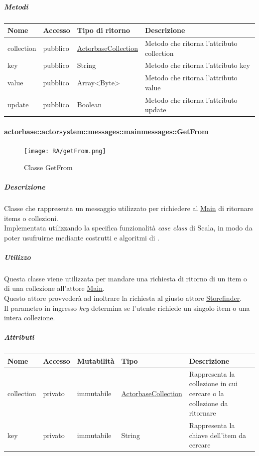 \documentclass{scalatekids-article}
\begin{document}
\subparagraph{Metodi}
\begin{tabular}{| p{3cm} | p{1.5cm} | p{3.5cm} | p{9cm} |}
  \hline
  Nome & Accesso & Tipo di ritorno & Descrizione\\
  \hline
  collection & pubblico & \hyperref[sec:actorbase::actorsystem::utils::ActorbaseCollection]{ActorbaseCollection} & Metodo che ritorna l'attributo collection\\
  \hline
  key & pubblico & String & Metodo che ritorna l'attributo key\\
  \hline
  value & pubblico & Array<Byte> & Metodo che ritorna l'attributo value\\
  \hline
  update & pubblico & Boolean & Metodo che ritorna l'attributo update\\
  \hline
\end{tabular}

\paragraph{actorbase::actorsystem::messages::mainmessages::GetFrom}
\label{sec:actorbase::actorsystem::messages::mainmessages::GetFrom}

\begin{figure}[H]
  \begin{center}
    \texttt{[image: RA/getFrom.png]}
    \caption{Classe GetFrom}
  \end{center}
\end{figure}

\subparagraph{Descrizione}
Classe che rappresenta un messaggio utilizzato per richiedere al
\hyperref[sec:actorbase::actorsystem::actors::main::Main]{Main} di ritornare items o collezioni.\\Implementata utilizzando la specifica funzionalità \textit{case class} di Scala,
in modo da poter usufruirne mediante costrutti e algoritmi di
.

\subparagraph{Utilizzo}
Questa classe viene utilizzata per mandare una richiesta di ritorno di un item o di una collezione all'attore
\hyperref[sec:actorbase::actorsystem::actors::main::Main]{Main}.\\Questo attore
provvederà ad inoltrare la richiesta al giusto attore \hyperref[sec:actorbase::actorsystem::actors::storefinder::Storefinder]{Storefinder}.\\Il
parametro in ingresso \textit{key} determina se l'utente richiede un singolo
item o una intera collezione.

\subparagraph{Attributi}
\begin{tabular}{| p{2cm} | p{1.5cm} | p{2cm} | p{3cm} | p{8.5cm} |}
  \hline
  Nome & Accesso & Mutabilità & Tipo & Descrizione\\
  \hline
  collection & privato & immutabile & \hyperref[sec:actorbase::actorsystem::utils::ActorbaseCollection]{ActorbaseCollection} & Rappresenta la collezione in cui cercare o la collezione da ritornare \\
  \hline
  key & privato & immutabile & String & Rappresenta la chiave dell'item da cercare\\
  \hline
\end{tabular}
\end{document}
